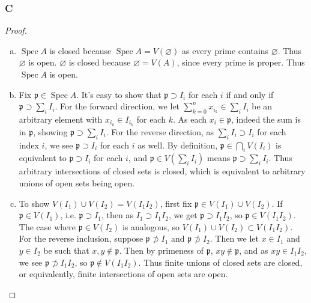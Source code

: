 \documentclass{article}
\newcommand{\frkp}{\mathfrak{p}}
\DeclareMathOperator{\Spec}{\mathrm{Spec}}
\let\emptyset\varnothing
\theoremstyle{definition} %
\begin{document}
\subsubsection{C}\label{3.4.C}
\begin{proof}
    \begin{enumerate}[(a)]
        \item $\Spec A$ is closed because $\Spec A = V(\emptyset)$ as every prime contains $\emptyset$. Thus $\emptyset$ is open. $\emptyset$ is closed because $\emptyset = V(A)$, since every prime is proper. Thus $\Spec A$ is open.
        \item Fix $\frkp \in \Spec A$. It's easy to show that $\frkp \supset I_i$ for each $i$ if and only if $\frkp \supset \sum_i I_i$. For the forward direction, we let $\sum_{k=0}^n x_{i_k}\in \sum_i I_i$ be an arbitrary element with $x_{i_k}\in I_{i_k}$ for each $k$. As each $x_i\in \frkp$, indeed the sum is in $\frkp$, showing $\frkp \supset \sum_i I_i$. For the reverse direction, as $\sum_i I_i\supset I_i$ for each index $i$, we see $\frkp \supset I_i$ for each $i$ as well. By definition, $\frkp\in \bigcap_i V(I_i)$ is equivalent to $\frkp\supset I_i$ for each $i$, and $\frkp \in V(\sum_i I_i)$ means $\frkp \supset \sum_i I_i$. Thus arbitrary intersections of closed sets is closed, which is equivalent to arbitrary unions of open sets being open.
        \item To show $V(I_1)\cup V(I_2)=V(I_1I_2)$, first fix $\frkp \in V(I_1)\cup V(I_2)$. If $\frkp \in V(I_1)$, i.e. $\frkp \supset I_1$, then as $I_1\supset I_1I_2$, we get $\frkp \supset I_1I_2$, so $\frkp \in V(I_1I_2)$. The case where $\frkp \in V(I_2)$ is analogous, so $V(I_1)\cup V(I_2) \subset V(I_1I_2)$. For the reverse inclusion, suppose $\frkp \not \supset I_1$ and $\frkp \not \supset I_2$. Then we let $x\in I_1$ and $y\in I_2$ be such that $x,y\notin \frkp$. Then by primeness of $\frkp$, $xy\notin \frkp$, and as $xy\in I_1I_2$, we see $\frkp \not \supset I_1I_2$, so $\frkp \notin V(I_1I_2)$. Thus finite unions of closed sets are closed, or equivalently, finite intersections of open sets are open.
    \end{enumerate}
\end{proof}
\end{document}
